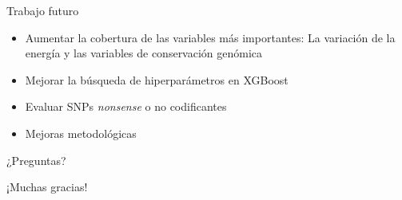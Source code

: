 \documentclass[
  spanish,
  ignorenonframetext,
]{beamer}
\providecommand{\tightlist}{%
  \setlength{\itemsep}{0pt}\setlength{\parskip}{0pt}}
\begin{document}
\begin{frame}{Trabajo futuro}
\protect\hypertarget{trabajo-futuro}{}

\begin{itemize}
\tightlist
\item
  Aumentar la cobertura de las variables más importantes: La variación
  de la energía y las variables de conservación genómica
\item
  Mejorar la búsqueda de hiperparámetros en XGBoost
\item
  Evaluar SNPs \textit{nonsense} o no codificantes
\item
  Mejoras metodológicas
\end{itemize}

\end{frame}

\begin{frame}{}
\protect\hypertarget{section-4}{}

\begin{center}
\Huge ¿Preguntas?
\end{center}

\end{frame}

\begin{frame}{}
\protect\hypertarget{section-5}{}

\begin{center}
\Huge ¡Muchas gracias!
\end{center}

\end{frame}
\end{document}

